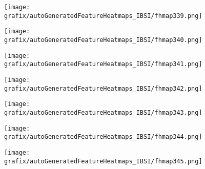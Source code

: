 \hspace{\hsp} 
\begin{subfigure}{\wid\textwidth} 
    \centering 
    \caption{\tiny \sffamily {}} 
    \vspace{\vsp} 
    \texttt{[image: grafix/autoGeneratedFeatureHeatmaps\_IBSI/fhmap339.png]} 
\end{subfigure} 
\hspace{\hsp} 
\begin{subfigure}{\wid\textwidth} 
    \centering 
    \caption{\tiny \sffamily {}} 
    \vspace{\vsp} 
    \texttt{[image: grafix/autoGeneratedFeatureHeatmaps\_IBSI/fhmap340.png]} 
\end{subfigure} 
\hspace{\hsp} 
\begin{subfigure}{\wid\textwidth} 
    \centering 
    \caption{\tiny \sffamily {}} 
    \vspace{\vsp} 
    \texttt{[image: grafix/autoGeneratedFeatureHeatmaps\_IBSI/fhmap341.png]} 
\end{subfigure} 
\hspace{\hsp} 
\begin{subfigure}{\wid\textwidth} 
    \centering 
    \caption{\tiny \sffamily {}} 
    \vspace{\vsp} 
    \texttt{[image: grafix/autoGeneratedFeatureHeatmaps\_IBSI/fhmap342.png]} 
\end{subfigure} 
\hspace{\hsp} 
\begin{subfigure}{\wid\textwidth} 
    \centering 
    \caption{\tiny \sffamily {}} 
    \vspace{\vsp} 
    \texttt{[image: grafix/autoGeneratedFeatureHeatmaps\_IBSI/fhmap343.png]} 
\end{subfigure} 
\hspace{\hsp} 
\begin{subfigure}{\wid\textwidth} 
    \centering 
    \caption{\tiny \sffamily {}} 
    \vspace{\vsp} 
    \texttt{[image: grafix/autoGeneratedFeatureHeatmaps\_IBSI/fhmap344.png]} 
\end{subfigure} 
\hspace{\hsp} 
\begin{subfigure}{\wid\textwidth} 
    \centering 
    \caption{\tiny \sffamily {}} 
    \vspace{\vsp} 
    \texttt{[image: grafix/autoGeneratedFeatureHeatmaps\_IBSI/fhmap345.png]} 
\end{subfigure} 
